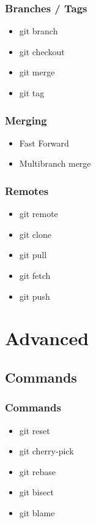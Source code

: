 \documentclass{beamer}
\begin{document}
			\begin{frame}
				\frametitle{Branches / Tags}

				\begin{itemize}
					\item{git branch}
					\item{git checkout}
					\item{git merge}
					\item{git tag}
				\end{itemize}
			\end{frame}

			\begin{frame}
				\frametitle{Merging}

				\begin{itemize}
					\item{Fast Forward}
					\item{Multibranch merge}
				\end{itemize}
			\end{frame}

			\begin{frame}
				\frametitle{Remotes}

				\begin{itemize}
					\item{git remote}
					\item{git clone}
					\item{git pull}
					\item{git fetch}
					\item{git push}
				\end{itemize}
			\end{frame}

	\section{Advanced}

		\subsection{Commands}

			\begin{frame}
				\frametitle{Commands}

				\begin{itemize}
					\item{git reset}
					\item{git cherry-pick}
					\item{git rebase}
					\item{git bisect}
					\item{git blame}
				\end{itemize}
			\end{frame}
\end{document}
